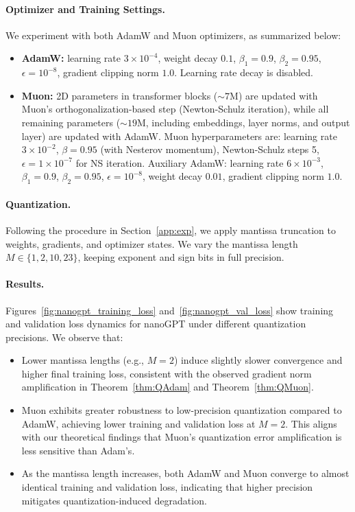 \documentclass[11pt, letterpaper]{article}
\begin{document}
\paragraph{Optimizer and Training Settings.} We experiment with both AdamW and Muon optimizers, as summarized below:

\begin{itemize}[leftmargin=*]
    \item \textbf{AdamW:} learning rate $3\times10^{-4}$, weight decay $0.1$, $\beta_1=0.9$, $\beta_2=0.95$, $\epsilon=10^{-8}$, gradient clipping norm $1.0$. Learning rate decay is disabled.
    \item \textbf{Muon:} 2D parameters in transformer blocks ($\sim7$M) are updated with Muon’s orthogonalization-based step (Newton-Schulz iteration), while all remaining parameters ($\sim19$M, including embeddings, layer norms, and output layer) are updated with AdamW. Muon hyperparameters are: learning rate $3\times10^{-2}$, $\beta=0.95$ (with Nesterov momentum), Newton-Schulz steps 5, $\epsilon=1\times10^{-7}$ for NS iteration. Auxiliary AdamW: learning rate $6\times10^{-3}$, $\beta_1=0.9$, $\beta_2=0.95$, $\epsilon=10^{-8}$, weight decay $0.01$, gradient clipping norm $1.0$.
\end{itemize}

\paragraph{Quantization.} Following the procedure in Section~\ref{app:exp}, we apply mantissa truncation to weights, gradients, and optimizer states. We vary the mantissa length $M \in \{1,2,10,23\}$, keeping exponent and sign bits in full precision.

\paragraph{Results.} Figures~\ref{fig:nanogpt_training_loss} and~\ref{fig:nanogpt_val_loss} show training and validation loss dynamics for nanoGPT under different quantization precisions. We observe that:

\begin{itemize}
    \item Lower mantissa lengths (e.g., $M=2$) induce slightly slower convergence and higher final training loss, consistent with the observed gradient norm amplification in Theorem~\ref{thm:QAdam} and Theorem~\ref{thm:QMuon}.
    \item Muon exhibits greater robustness to low-precision quantization compared to AdamW, achieving lower training and validation loss at $M=2$. This aligns with our theoretical findings that Muon’s quantization error amplification is less sensitive than Adam’s.
    \item As the mantissa length increases, both AdamW and Muon converge to almost identical training and validation loss, indicating that higher precision mitigates quantization-induced degradation.
\end{itemize}
\end{document}
